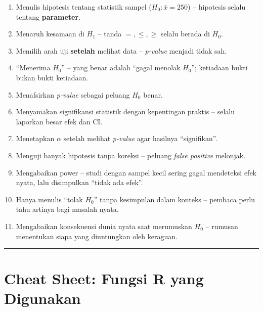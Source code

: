 \documentclass[
  indonesian,
  letterpaper,
]{book}
\providecommand{\tightlist}{%
  \setlength{\itemsep}{0pt}\setlength{\parskip}{0pt}}
\begin{document}
\begin{enumerate}
\def\labelenumi{\arabic{enumi}.}
\tightlist
\item
  Menulis hipotesis tentang statistik sampel (\(H_0: \bar{x} = 250\)) --
  hipotesis selalu tentang \textbf{parameter}.
\item
  Menaruh kesamaan di \(H_1\) -- tanda \(=, \leq, \geq\) selalu berada
  di \(H_0\).
\item
  Memilih arah uji \textbf{setelah} melihat data -- \emph{p-value}
  menjadi tidak sah.
\item
  ``Menerima \(H_0\)'' -- yang benar adalah ``gagal menolak \(H_0\)'';
  ketiadaan bukti bukan bukti ketiadaan.
\item
  Menafsirkan \emph{p-value} sebagai peluang \(H_0\) benar.
\item
  Menyamakan signifikansi statistik dengan kepentingan praktis -- selalu
  laporkan besar efek dan CI.
\item
  Menetapkan \(\alpha\) setelah melihat \emph{p-value} agar hasilnya
  ``signifikan''.
\item
  Menguji banyak hipotesis tanpa koreksi -- peluang \emph{false
  positive} melonjak.
\item
  Mengabaikan power -- studi dengan sampel kecil sering gagal mendeteksi
  efek nyata, lalu disimpulkan ``tidak ada efek''.
\item
  Hanya menulis ``tolak \(H_0\)'' tanpa kesimpulan dalam konteks --
  pembaca perlu tahu artinya bagi masalah nyata.
\item
  Mengabaikan konsekuensi dunia nyata saat merumuskan \(H_0\) -- rumusan
  menentukan siapa yang diuntungkan oleh keraguan.
\end{enumerate}

\begin{center}\rule{0.5\linewidth}{0.5pt}\end{center}

\section{Cheat Sheet: Fungsi R yang
Digunakan}\label{cheat-sheet-fungsi-r-yang-digunakan-1}
\end{document}
